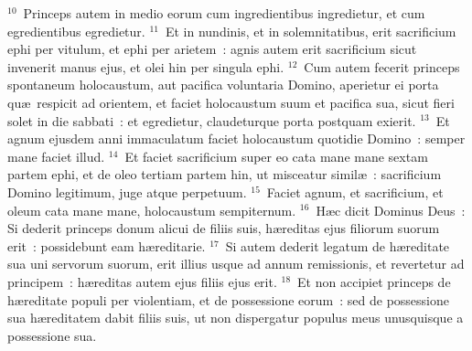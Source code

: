 ${}^{10}$~Princeps autem in medio eorum cum ingredientibus ingredietur, et cum egredientibus egredietur.
${}^{11}$~Et in nundinis, et in solemnitatibus, erit sacrificium ephi per vitulum, et ephi per arietem~: agnis autem erit sacrificium sicut invenerit manus ejus, et olei hin per singula ephi.
${}^{12}$~Cum autem fecerit princeps spontaneum holocaustum, aut pacifica voluntaria Domino, aperietur ei porta qu\ae\ respicit ad orientem, et faciet holocaustum suum et pacifica sua, sicut fieri solet in die sabbati~: et egredietur, claudeturque porta postquam exierit.
${}^{13}$~Et agnum ejusdem anni immaculatum faciet holocaustum quotidie Domino~: semper mane faciet illud.
${}^{14}$~Et faciet sacrificium super eo cata mane mane sextam partem ephi, et de oleo tertiam partem hin, ut misceatur simil\ae~: sacrificium Domino legitimum, juge atque perpetuum.
${}^{15}$~Faciet agnum, et sacrificium, et oleum cata mane mane, holocaustum sempiternum.
${}^{16}$~H\ae c dicit Dominus Deus~: Si dederit princeps donum alicui de filiis suis, h\ae reditas ejus filiorum suorum erit~: possidebunt eam h\ae reditarie.
${}^{17}$~Si autem dederit legatum de h\ae reditate sua uni servorum suorum, erit illius usque ad annum remissionis, et revertetur ad principem~: h\ae reditas autem ejus filiis ejus erit.
${}^{18}$~Et non accipiet princeps de h\ae reditate populi per violentiam, et de possessione eorum~: sed de possessione sua h\ae reditatem dabit filiis suis, ut non dispergatur populus meus unusquisque a possessione sua.


